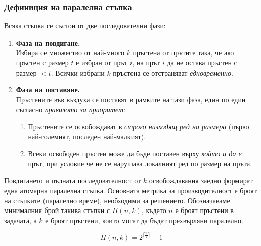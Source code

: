 \subsubsection{Дефиниция на паралелна стъпка}\label{subsec:parallel-step}

Всяка стъпка се състои от две последователни фази:

\begin{enumerate}
	\item \textbf{Фаза на повдигане.}\\
	Избира се множество от най-много \(k\) пръстена от прътите така, че ако пръстен с размер \(t\) е избран от прът \(i\), на прът \(i\) да не остава пръстен с размер \(< t\). Всички избрани \(k\) пръстена се отстраняват \emph{едновременно}.
	
	\item \textbf{Фаза на поставяне.}\\
	Пръстените във въздуха се поставят в рамките на тази фаза, един по един съгласно \emph{правилото за приоритет}:
	\begin{enumerate}
		\item Пръстените се освобождават в \emph{строго низходящ ред на размера} (първо най-големият, последен най-малкият).
		\item Всеки освободен пръстен може да бъде поставен върху \emph{който и да е} прът, при условие че не се нарушава локалният ред по размер на пръта.
	\end{enumerate}
\end{enumerate}

Повдигането и пълната последователност от \(k\) освобождавания заедно формират една атомарна паралелна стъпка. Основната метрика за производителност е броят на стъпките (паралелно време), необходими за решението. Обозначаваме минималния брой такива стъпки с \(H(n, k)\), където \(n\) е броят пръстени в задачата, а \(k\) е броят пръстени, които могат да бъдат прехвърляни паралелно.

\begin{Theorem}\label{thm:main}
	\begin{equation}\label{eq:H-nk}
		H(n,k) = 2^{\bigl\lceil \textstyle \frac{n}{k} \bigr\rceil} - 1
	\end{equation}
\end{Theorem}

